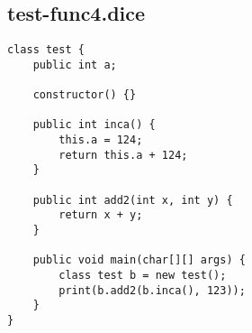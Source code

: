 \subsection{test-func4.dice}
\begin{verbatim}
class test {
	public int a;

	constructor() {}

	public int inca() { 
		this.a = 124;
		return this.a + 124; 
	} 

	public int add2(int x, int y) {
		return x + y;
	}

	public void main(char[][] args) {
		class test b = new test();
	  	print(b.add2(b.inca(), 123));
	}
}

\end{verbatim}